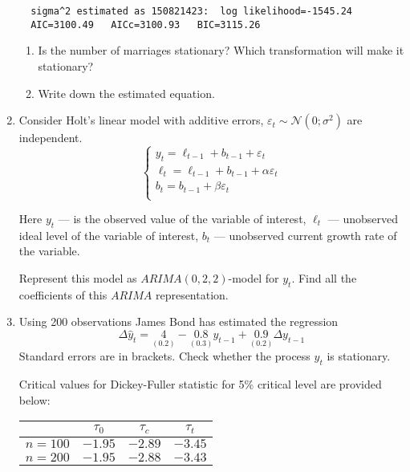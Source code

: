 \documentclass[12pt]{article}
\def \cN{\mathcal{N}}
\begin{document}
\begin{enumerate}
\begin{verbatim}
  sigma^2 estimated as 150821423:  log likelihood=-1545.24
  AIC=3100.49   AICc=3100.93   BIC=3115.26
\end{verbatim}

\begin{enumerate}
\item Is the number of marriages stationary? Which transformation will make it stationary?
\item Write down the estimated equation.
\end{enumerate}

\newpage
\item Consider Holt’s linear model with additive errors, $\varepsilon_t \sim \cN(0;\sigma^2)$ are independent.
\[
\begin{cases}
y_t = \ell_{t-1} + b_{t-1} + \varepsilon_t \\
\ell_t = \ell_{t-1} + b_{t-1} + \alpha \varepsilon_t \\
b_t = b_{t-1} + \beta \varepsilon_t \\
\end{cases}
\]

Here $y_t$ — is the observed value of the variable of interest, $\ell_t$ — unobserved ideal level of the variable of interest, $b_t$ — unobserved current growth rate of the variable.


Represent this model as $ARIMA(0, 2, 2)$-model for $y_t$. Find all the coefficients of this $ARIMA$ representation.


\item Using 200 observations James Bond has estimated the regression
\[
\Delta \hat y_t = \underset{(0.2)}{4} - \underset{(0.3)}{0.8} y_{t-1} +  \underset{(0.2)}{0.9} \Delta y_{t-1}
\]
Standard errors are in brackets. Check whether the process $y_t$ is stationary.

Critical values for Dickey-Fuller statistic for 5\% critical level are provided below:

\begin{tabular}{cccc}
	\toprule
	& $\tau_0$ & $\tau_c$ & $\tau_t$  \\
	\midrule
	$n=100$ & $-1.95$ & $-2.89$ & $-3.45$  \\
	$n=200$ & $-1.95$ & $-2.88$ & $-3.43$ \\
	\bottomrule
\end{tabular}





\end{enumerate}
\end{document}
